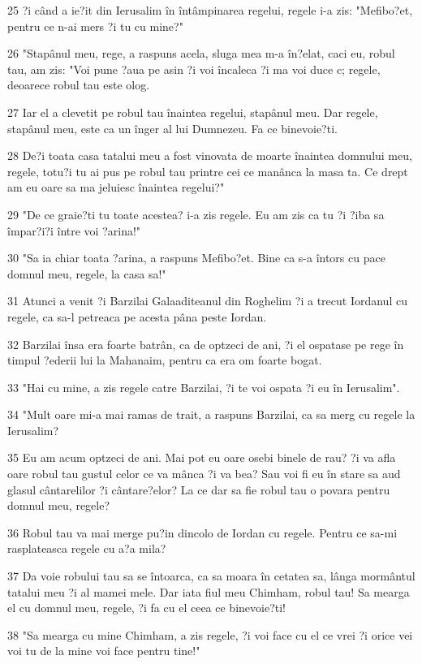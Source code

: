 \par 25 ?i când a ie?it din Ierusalim în întâmpinarea regelui, regele i-a zis: "Mefibo?et, pentru ce n-ai mers ?i tu cu mine?"
\par 26 "Stapânul meu, rege, a raspuns acela, sluga mea m-a în?elat, caci eu, robul tau, am zis: "Voi pune ?aua pe asin ?i voi încaleca ?i ma voi duce c; regele, deoarece robul tau este olog.
\par 27 Iar el a clevetit pe robul tau înaintea regelui, stapânul meu. Dar regele, stapânul meu, este ca un înger al lui Dumnezeu. Fa ce binevoie?ti.
\par 28 De?i toata casa tatalui meu a fost vinovata de moarte înaintea domnului meu, regele, totu?i tu ai pus pe robul tau printre cei ce manânca la masa ta. Ce drept am eu oare sa ma jeluiesc înaintea regelui?"
\par 29 "De ce graie?ti tu toate acestea? i-a zis regele. Eu am zis ca tu ?i ?iba sa împar?i?i între voi ?arina!"
\par 30 "Sa ia chiar toata ?arina, a raspuns Mefibo?et. Bine ca s-a întors cu pace domnul meu, regele, la casa sa!"
\par 31 Atunci a venit ?i Barzilai Galaaditeanul din Roghelim ?i a trecut Iordanul cu regele, ca sa-l petreaca pe acesta pâna peste Iordan.
\par 32 Barzilai însa era foarte batrân, ca de optzeci de ani, ?i el ospatase pe rege în timpul ?ederii lui la Mahanaim, pentru ca era om foarte bogat.
\par 33 "Hai cu mine, a zis regele catre Barzilai, ?i te voi ospata ?i eu în Ierusalim".
\par 34 "Mult oare mi-a mai ramas de trait, a raspuns Barzilai, ca sa merg cu regele la Ierusalim?
\par 35 Eu am acum optzeci de ani. Mai pot eu oare osebi binele de rau? ?i va afla oare robul tau gustul celor ce va mânca ?i va bea? Sau voi fi eu în stare sa aud glasul cântarelilor ?i cântare?elor? La ce dar sa fie robul tau o povara pentru domnul meu, regele?
\par 36 Robul tau va mai merge pu?in dincolo de Iordan cu regele. Pentru ce sa-mi rasplateasca regele cu a?a mila?
\par 37 Da voie robului tau sa se întoarca, ca sa moara în cetatea sa, lânga mormântul tatalui meu ?i al mamei mele. Dar iata fiul meu Chimham, robul tau! Sa mearga el cu domnul meu, regele, ?i fa cu el ceea ce binevoie?ti!
\par 38 "Sa mearga cu mine Chimham, a zis regele, ?i voi face cu el ce vrei ?i orice vei voi tu de la mine voi face pentru tine!"
